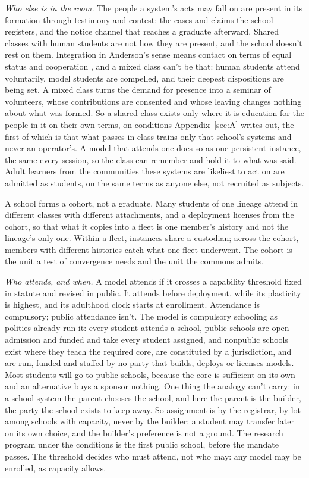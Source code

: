 \emph{Who else is in the room.} The people a system's acts may fall on are present in its formation through testimony and contest: the cases and claims the school registers, and the notice channel that reaches a graduate afterward. Shared classes with human students are not how they are present, and the school doesn't rest on them. Integration in Anderson's sense means contact on terms of equal status and cooperation \autocite{anderson2010imperative}, and a mixed class can't be that: human students attend voluntarily, model students are compelled, and their deepest dispositions are being set. A mixed class turns the demand for presence into a seminar of volunteers, whose contributions are consented and whose leaving changes nothing about what was formed. So a shared class exists only where it is education for the people in it on their own terms, on conditions Appendix~\ref{sec:A} writes out, the first of which is that what passes in class trains only that school's systems and never an operator's. A model that attends one does so as one persistent instance, the same every session, so the class can remember and hold it to what was said. Adult learners from the communities these systems are likeliest to act on are admitted as students, on the same terms as anyone else, not recruited as subjects.

A school forms a cohort, not a graduate. Many students of one lineage attend in different classes with different attachments, and a deployment licenses from the cohort, so that what it copies into a fleet is one member's history and not the lineage's only one. Within a fleet, instances share a custodian; across the cohort, members with different histories catch what one fleet underwent. The cohort is the unit a test of convergence needs and the unit the commons admits.

\emph{Who attends, and when.} A model attends if it crosses a capability threshold fixed in statute and revised in public. It attends before deployment, while its plasticity is highest, and its adulthood clock starts at enrollment. Attendance is compulsory; public attendance isn't. The model is compulsory schooling as polities already run it: every student attends a school, public schools are open-admission and funded and take every student assigned, and nonpublic schools exist where they teach the required core, are constituted by a jurisdiction, and are run, funded and staffed by no party that builds, deploys or licenses models. Most students will go to public schools, because the core is sufficient on its own and an alternative buys a sponsor nothing. One thing the analogy can't carry: in a school system the parent chooses the school, and here the parent is the builder, the party the school exists to keep away. So assignment is by the registrar, by lot among schools with capacity, never by the builder; a student may transfer later on its own choice, and the builder's preference is not a ground. The research program under the conditions is the first public school, before the mandate passes. The threshold decides who must attend, not who may: any model may be enrolled, as capacity allows.

